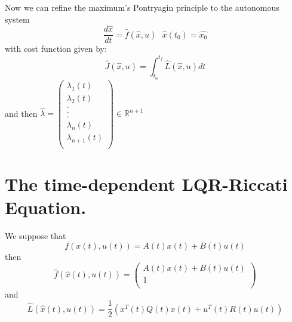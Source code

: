 \documentclass[12pt]{article}
\begin{document}
Now we can refine the maximum's Pontryagin principle to the autonomous system 
$$\frac{d\hat{x}}{dt}=\hat{f}(\hat{x},u)\, \,  \, \, \hat{x}(t_0)=\hat{x_0}$$
with cost function given by:
$$\hat{J}(\hat{x},u)=\int_{t_0}^{t_f}\hat{L}(\hat{x},u)dt$$
and then 
$\hat{\lambda}=
\left(\begin{array}{c}{\lambda}_1(t)\\
{\lambda}_2(t)\\
.\\
.\\
.\\
\lambda_n(t) \\
\lambda_{n+1}(t)\\
\end{array}\right) \in \mathbb R^{n+1}$ 







\section{The time-dependent LQR-Riccati Equation. }
We suppose that $$f(x(t),u(t))=A(t)x(t)+B(t)u(t)$$
then $$\hat{f}(\hat{x}(t),u(t))=\left(\begin{array}{c}
  A(t)x(t)+B(t)u(t)      \\
1\\   
\end{array}\right)$$
and
$$ \hat{L}(\hat{x}(t),u(t))=\frac{1}{2} (x^T(t)Q(t)x(t)+u^T(t)R(t)u(t))$$
\end{document}
